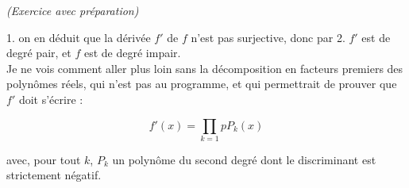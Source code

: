 \documentclass[11pt]{article}%
\begin{document}
\begin{exercice}{\it (Exercice avec préparation)}
\begin{noliste}{1.}
 on en déduit que la dérivée $f'$ de $f$ n'est pas surjective, donc par
2. $f'$ est de degré pair, et $f$ est de degré impair. \\

 Je ne vois comment aller plus loin sans la décomposition en facteurs
premiers des polynômes réels, qui n'est pas au programme, et qui
permettrait de prouver que $f'$ doit s'écrire : 
 
\[
 f'(x) = \prod\limits_{k = 1}{p} P_{k}(x) 
\]

 avec, pour tout $k$, $P_{k}$ un polynôme du second degré dont le
discriminant est strictement négatif.

 \end{noliste}
 \end{exercice}

 \newpage
\end{document}
